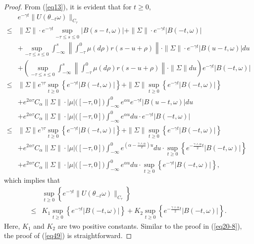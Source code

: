\documentclass[10pt,a4paper]{amsart}
\begin{document}
\begin{proof}From (\ref{eq13}), it is evident that for $t\geq0$,
\begin{align}\label{eq50}
&e^{-\gamma t}\|U(\theta_{-t}\omega)\|_{C_\tau}\nonumber\\
\leq&\|\Sigma\|\cdot e^{-\gamma t}\sup_{-\tau\leq s\leq0}|B(s-t,\omega)|+\|\Sigma\|\cdot e^{-\gamma t}|B(-t,\omega)|\nonumber\\
&+\sup_{-\tau\leq s\leq0}\int_{-\infty}^{s}\left\|\int_{-\tau}^0\mu(d\rho)r(s-u+\rho)\right\|\cdot\|\Sigma\|\cdot e^{-\gamma t}|B(u-t,\omega)|du\nonumber\\
&+\left(\sup_{-\tau\leq s\leq0}\int_{-\infty}^{s}\left\|\int_{-\tau}^0\mu(d\rho)r(s-u+\rho)\right\|\cdot\|\Sigma\|du\right)e^{-\gamma t}|B(-t,\omega)|\nonumber\\
\leq&\|\Sigma\|e^{\gamma\tau}\sup_{t\geq0}\left\{e^{-\gamma t}|B(-t,\omega)|\right\}+\|\Sigma\|\sup_{t\geq0}\left\{e^{-\gamma t}|B(-t,\omega)|\right\}\nonumber\\
&+e^{2\alpha\tau}C_\alpha\|\Sigma\|\cdot|\mu|\bigl([-\tau,0]\bigr)\int_{-\infty}^{0}e^{\alpha u}e^{-\gamma t}|B(u-t,\omega)|du\nonumber\\
&+e^{2\alpha\tau}C_\alpha\|\Sigma\|\cdot|\mu|\bigl([-\tau,0]\bigr)\int_{-\infty}^{0}e^{\alpha u}du\cdot e^{-\gamma t}|B(-t,\omega)|\nonumber\\
\leq&\|\Sigma\|e^{\gamma\tau}\sup_{t\geq0}\left\{e^{-\gamma t}|B(-t,\omega)|\right\}+\|\Sigma\|\sup_{t\geq0}\left\{e^{-\gamma t}|B(-t,\omega)|\right\}\nonumber\\
&+e^{2\alpha\tau}C_\alpha\|\Sigma\|\cdot|\mu|\bigl([-\tau,0]\bigr)\int_{-\infty}^{0}e^{(\alpha-\frac{\gamma\wedge\alpha}{2})u}du\cdot\sup_{t\geq0}\left\{e^{-\frac{\gamma\wedge\alpha}{2} t}|B(-t,\omega)|\right\}\nonumber\\
&+e^{2\alpha\tau}C_\alpha\|\Sigma\|\cdot|\mu|\bigl([-\tau,0]\bigr)\int_{-\infty}^{0}e^{\alpha u}du\cdot\sup_{t\geq0}\left\{e^{-\gamma t}|B(-t,\omega)|\right\},
\end{align}
which implies that
\begin{align}\label{eq51}
&\sup_{t\geq0}\left\{e^{-\gamma t}\|U(\theta_{-t}\omega)\|_{C_\tau}\right\}\nonumber\\
\leq&K_1\sup_{t\geq0}\left\{e^{-\gamma t}|B(-t,\omega)|\right\}+K_2\sup_{t\geq0}\left\{e^{-\frac{\gamma\wedge\alpha}{2} t}|B(-t,\omega)|\right\}.
\end{align}
Here, $K_1$ and $K_2$ are two positive constants. Similar to the proof in (\ref{eq20-8}), the proof of (\ref{eq49}) is straightforward.
\end{proof}
\end{document}

